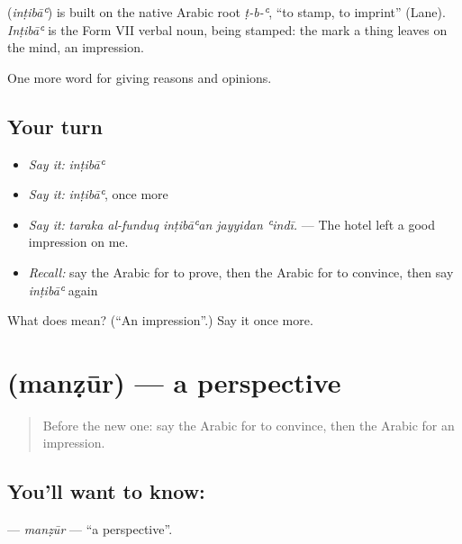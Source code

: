 \begin{cousinweb}
\textbf{} (\emph{inṭibāʿ}) is built on the native Arabic root \emph{ṭ-b-ʿ}, \textquotedblleft{}to stamp, to imprint\textquotedblright{} (Lane). \emph{Inṭibāʿ} is the Form VII verbal noun, being stamped: the mark a thing leaves on the mind, an impression.
\end{cousinweb}

\begin{grammarlens}[title={What you've built}]
One more word for giving reasons and opinions.
\end{grammarlens}

\subsection*{Your turn}
\begin{itemize}
\raggedright
  \item \emph{Say it:} \emph{inṭibāʿ}
  \item \emph{Say it:} \emph{inṭibāʿ}, once more
  \item \emph{Say it:} \emph{taraka al-funduq inṭibāʿan jayyidan ʿindī.} — The hotel left a good impression on me.
  \item \emph{Recall:} say the Arabic for to prove, then the Arabic for to convince, then say \emph{inṭibāʿ} again
\end{itemize}

\begin{tcolorbox}[breakable,colback=teal!4,colframe=teal!35!black,title={Before you move on}]
What does  mean? (\textquotedblleft{}An impression\textquotedblright{}.) Say it once more.
\end{tcolorbox}
\section[\texorpdfstring{\ar{منظور} (manẓūr)}{منظور (manẓūr)}]{ (manẓūr) — a perspective}

\label{lesson:AR-C359-manzur}



\begin{quote}
Before the new one: say the Arabic for to convince, then the Arabic for an impression.
\end{quote}

\subsection*{You'll want to know: }
\textbf{} — \emph{manẓūr} — \textquotedblleft{}a perspective\textquotedblright{}.

